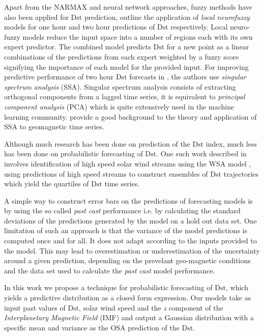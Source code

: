 Apart from the NARMAX and neural network approaches, fuzzy methods have also been applied for $\mathrm{Dst}$ prediction, \citet{SWE:SWE146,Sharifi2006} outline the application of \emph{local neurofuzzy} models for one hour and two hour predictions of $\mathrm{Dst}$ respectively. Local neuro-fuzzy models reduce the input space into a number of regions each with its own expert predictor. The combined model predicts $\mathrm{Dst}$ for a new point as a linear combinations of the predictions from each expert weighted by a fuzzy score signifying the importance of each model for the provided input. For improving predictive performance of two hour 
$\mathrm{Dst}$ forecasts in \citet{Sharifi2006}, the authors use \emph{singular spectrum analysis} (SSA). Singular spectrum analysis consists of extracting orthogonal components from a lagged time series, it is equivalent to \emph{principal component analysis} (PCA) which is quite extensively used in the machine learning community. \citet{loskutov2001testing,loskutov2001study} provide a good background to the theory and application of SSA to geomagnetic time series.

Although much research has been done on prediction of the $\mathrm{Dst}$ index, much less has been done on probabilistic forecasting of $\mathrm{Dst}$. One such work described in \citet{McPherron:2013} involves identification of high speed solar wind streams using the WSA model \citep{WSAModel}, using predictions of high speed streams to construct ensembles of $\mathrm{Dst}$ trajectories which yield the quartiles of 
$\mathrm{Dst}$ time series. 

A simple way to construct error bars on the predictions of forecasting models is by using the so called \textit{past cast} performance i.e. by calculating the standard deviations of the predictions generated by the model on a hold out data set. One limitation of such an approach is that the variance of the model predictions is computed once and for all. It does not adapt according to the inputs provided to the model. This may lead to overestimation or underestimation of the uncertainty around a given prediction, depending on the prevelant geo-magnetic conditions and the data set used to calculate the \textit{past cast} model performance.

In this work we propose a technique for probabilistic forecasting of $\mathrm{Dst}$, which yields a predictive distribution as a closed form expression. Our models take as input past values of $\mathrm{Dst}$, solar wind speed and the \textit{z} component of the \emph{Interplanetary Magnetic Field} (IMF) and output a Gaussian distribution with a specific mean and variance as the OSA prediction of the $\mathrm{Dst}$. 

